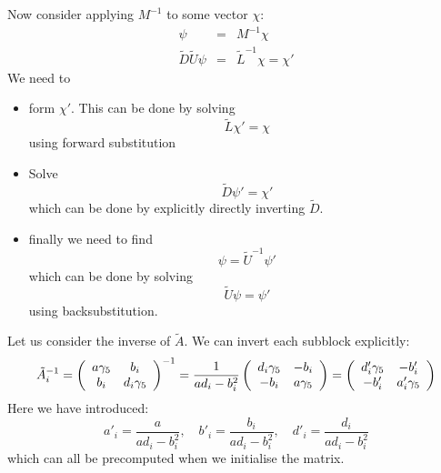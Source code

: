\documentclass[12pt]{article}
\begin{document}
Now consider applying $M^{-1}$ to some vector $\chi$:
\begin{eqnarray}
 \psi &=& M^{-1}\chi \\
\tilde{D} \tilde{U} \psi &=& \tilde{L}^{-1} \chi = \chi'
\end{eqnarray}
We need to
\begin{itemize}
\item
form $\chi'$. This can be done by solving
\begin{equation}
\tilde{L} \chi' = \chi
\end{equation} 
using forward substitution
\item
Solve 
\begin{equation}
\tilde{D} \psi' = \chi'
\end{equation}
which can be done by explicitly directly inverting $\tilde{D}$.
\item
finally we need to find
\begin{equation}
\psi = \tilde{U}^{-1} \psi'
\end{equation}
which can be done by solving
\begin{equation}
\tilde{U} \psi = \psi'
\end{equation}
using backsubstitution.
\end{itemize}

Let us consider the inverse of $\tilde{A}$. We can invert each subblock
explicitly:
\begin{equation}
\tilde{A}^{-1}_i = \left(
\begin{array}{cc}
a \gamma_5 & b_i \\
b_i & d_i \gamma_5
\end{array} \right)^{-1} 
= \frac{1}{a d_i - b^{2}_i} \left( \begin{array}{cc}
d_i \gamma_5 & -b_i \\
-b_i &  a \gamma_5 
\end{array} \right) = 
\left( \begin{array}{cc}
 d'_i \gamma_5 & -b'_i \\
-b'_i & a'_i \gamma_5 \\
\end{array} \right)
\end{equation}
Here we have introduced:
\begin{equation}
a'_i = \frac{a}{a d_i - b^2_i}, \quad
b'_i = \frac{b_i}{a d_i - b^2_i}, \quad
d'_i = \frac{d_i}{a d_i - b^2_i}
\end{equation}
which can all be precomputed when we initialise the matrix.
\end{document}
